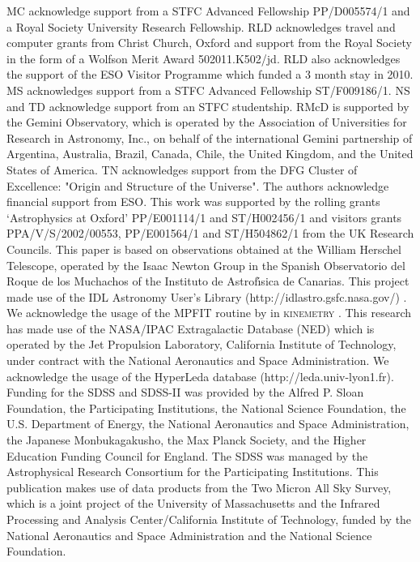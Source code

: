 \documentclass[usenatbib,usegraphicx]{mn2e}
\begin{document}
\noindent MC acknowledge support from a STFC Advanced Fellowship PP/D005574/1 and a Royal Society University Research Fellowship. RLD acknowledges travel and computer grants from Christ Church, Oxford and support from the Royal Society in the form of a Wolfson Merit Award 502011.K502/jd. RLD also acknowledges the support of the ESO Visitor Programme which funded a 3 month stay in 2010. MS acknowledges support from a STFC Advanced Fellowship ST/F009186/1. NS and TD acknowledge support from an STFC studentship. RMcD is supported by the Gemini Observatory, which is operated by the Association of Universities for Research in Astronomy, Inc., on behalf of the international Gemini partnership of Argentina, Australia, Brazil, Canada, Chile, the United Kingdom, and the United States of America. TN acknowledges support from the DFG Cluster of Excellence: "Origin and Structure of the Universe". The authors acknowledge financial support from ESO. This work was supported by the rolling grants `Astrophysics at Oxford' PP/E001114/1 and ST/H002456/1 and visitors grants PPA/V/S/2002/00553, PP/E001564/1 and ST/H504862/1 from the UK Research Councils. This paper is based on observations obtained at the William Herschel Telescope, operated by the Isaac Newton Group in the Spanish Observatorio del Roque de los Muchachos of the Instituto de Astrof\'{\i}sica de Canarias. This project made use of the IDL Astronomy User's Library (http://idlastro.gsfc.nasa.gov/) \citep{1993adass...2..246L}.  We acknowledge the usage of the MPFIT routine by \citet{2009ASPC..411..251M} in \textsc{kinemetry} . This research has made use of the NASA/IPAC Extragalactic Database (NED) which is operated by the Jet Propulsion Laboratory, California Institute of Technology, under contract with the National Aeronautics and Space Administration. We acknowledge the usage of the HyperLeda database (http://leda.univ-lyon1.fr). Funding for the SDSS and SDSS-II was provided by the Alfred P. Sloan Foundation, the Participating Institutions, the National Science Foundation, the U.S. Department of Energy, the National Aeronautics and Space Administration, the Japanese Monbukagakusho, the Max Planck Society, and the Higher Education Funding Council for England. The SDSS was managed by the Astrophysical Research Consortium for the Participating Institutions. This publication makes use of data products from the Two Micron All Sky Survey, which is a joint project of the University of Massachusetts and the Infrared Processing and Analysis Center/California Institute of Technology, funded by the National Aeronautics and Space Administration and the National Science Foundation. 
\end{document}
